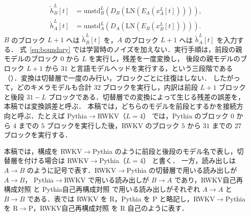 \documentclass[techrep,noauthor]{ipsj}
\newcommand{\RWKVself}{RWKV自己再構成対照}
\newcommand{\Pythiaself}{Pythia自己再構成対照}
\newcommand{\RtoP}{RWKV$\to$\allowbreak Pythia}
\newcommand{\PtoR}{Pythia$\to$\allowbreak RWKV}
\newcommand{\RtoPL}[1]{\RtoP{}（$L{=}#1$）}
\newcommand{\PtoRL}[1]{\PtoR{}（$L{=}#1$）}
\begin{document}
\begin{equation}\label{eq:boundary}
\begin{aligned}
\widetilde h_B^L[t]
 &= \mathrm{unstd}_B^L\!\left(D_B\!\left(\mathrm{LN}(E_A(x_A^L[t]))\right)\right),\\
\widetilde h_A^L[t]
 &= \mathrm{unstd}_A^L\!\left(D_A\!\left(\mathrm{LN}(E_B(x_B^L[t]))\right)\right).
\end{aligned}
\end{equation}
$B$ のブロック $L{+}1$ へは $\widetilde h_B^L[t]$ を，$A$ のブロック $L{+}1$ へは $\widetilde h_A^L[t]$ を入力する．
式~\eqref{eq:boundary} では学習時のノイズを加えない．実行手順は，前段の親モデルのブロック $0$ から $L$ を実行し，残差を一度変換し，
後段の親モデルのブロック $L{+}1$ から $31$ と言語モデルヘッドを実行する，という三段階である（）．変換は切替層で一度のみ行い，ブロックごとに往復はしない．
したがって，どのキメラモデルも合計 $32$ ブロックを実行し，内訳は前段 $L{+}1$ ブロックと後段 $31{-}L$ ブロックである．切替層での変換によって生じる残差の誤差を，本稿では変換誤差と呼ぶ．
本稿では，どちらのモデルを前段とするかを接続方向と呼ぶ．たとえば \PtoRL{4} では，Pythia のブロック $0$ から $4$ までの $5$ ブロックを実行した後，RWKV のブロック $5$ から $31$ までの
$27$ ブロックを実行する．

本稿では，構成を \RtoP{} のように前段と後段のモデル名で表し，切替層を付ける場合は \RtoPL{4} と書く．
一方，読み出しは $A\!\to\!B$ のように記号で表す．\RtoP{} の切替層で用いる読み出しが $A\!\to\!B$，
\PtoR{} で用いる読み出しが $B\!\to\!A$ であり，\RWKVself{} と \Pythiaself{} で用いる読み出しがそれぞれ $A\!\to\!A$ と $B\!\to\!B$ である．表では RWKV を R，Pythia を P と略記し，\RtoP{} を R$\to$P，\RWKVself{} を R 自己のように表す．
\end{document}
